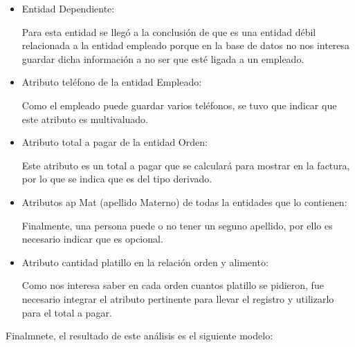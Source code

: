\documentclass[12pt, letterpaper]{article} %
\begin{document}
\begin{itemize}
    \item Entidad Dependiente:

    Para esta entidad se llegó a la conclusión de que es una entidad débil relacionada a la entidad empleado porque en la base de datos no nos interesa guardar dicha información a no ser que esté ligada a un empleado.

    \item Atributo teléfono de la entidad Empleado:

    Como el empleado puede guardar varios teléfonos, se tuvo que indicar que este atributo es multivaluado.

    \item Atributo total a pagar de la entidad Orden:

    Este atributo es un total a pagar que se calculará para mostrar en la factura, por lo que se indica que es del tipo derivado.

    \item Atributos ap Mat (apellido Materno) de todas la entidades que lo contienen:

    Finalmente, una persona puede o no tener un seguno apellido, por ello es necesario indicar que es opcional.

    \item Atributo cantidad platillo en la relación orden y alimento:

    Como nos interesa saber en cada orden cuantos platillo se pidieron, fue necesario integrar el atributo pertinente para llevar el registro y utilizarlo para el total a pagar.

\end{itemize}

\newpage
Finalmnete, el resultado de este análisis es el siguiente modelo:
\end{document}
